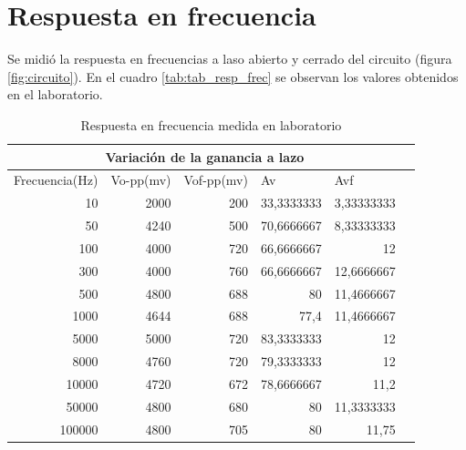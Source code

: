 \documentclass[12pt, letterpaper]{article}
\begin{document}
\section{Respuesta en frecuencia}
Se midió la respuesta en frecuencias a laso abierto y cerrado del circuito (figura \ref{fig:circuito}). En el cuadro \ref{tab:tab_resp_frec} se observan los valores obtenidos en el laboratorio.
\begin{table}[H]
    \centering
    \caption{Respuesta en frecuencia medida en laboratorio}
    \begin{tabular}{|r|r|r|r|r|r}
        
    \hline \multicolumn{5}{|c|}{Variación de la ganancia a lazo } &  \\
    
    \hline  \multicolumn{1}{|l|}{Frecuencia(Hz)} & \multicolumn{1}{l|}{Vo-pp(mv)} & \multicolumn{1}{l|}{Vof-pp(mv)} & \multicolumn{1}{l|}{Av} & \multicolumn{1}{l|}{Avf} &  \\
    
    \cmidrule    10    & 2000  & 200   & 33,3333333 & 3,33333333 &  \\
    
    \cmidrule   50    & 4240  & 500   & 70,6666667 & 8,33333333 &  \\
    
    \cmidrule    100   & 4000  & 720   & 66,6666667 & 12    &  \\
    
    \cmidrule    300   & 4000  & 760   & 66,6666667 & 12,6666667 &  \\
    
    \cmidrule    500   & 4800  & 688   & 80    & 11,4666667 &  \\
    
    \cmidrule    1000  & 4644  & 688   & 77,4  & 11,4666667 &  \\
    
    \cmidrule    5000  & 5000  & 720   & 83,3333333 & 12    &  \\
    
    \cmidrule   8000  & 4760  & 720   & 79,3333333 & 12    &  \\
    
    \cmidrule   10000 & 4720  & 672   & 78,6666667 & 11,2  &  \\
    
    \cmidrule    50000 & 4800  & 680   & 80    & 11,3333333 &  \\
    
    \cmidrule   100000 & 4800  & 705   & 80    & 11,75 &  \\
    

\end{tabular}
\end{table}
\end{document}
